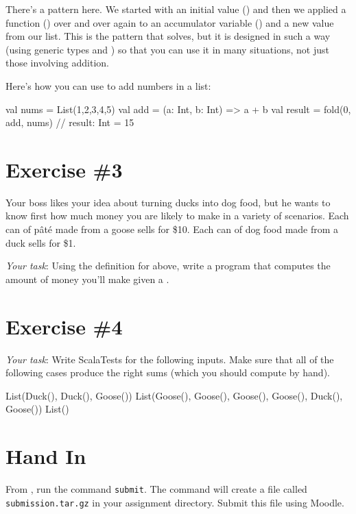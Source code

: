 \documentclass{book}
\begin{document}
There's a pattern here.  We started with an initial value () and then we applied a function (\scalainline{+}) over and over again to an accumulator variable () and a new value from our list.  This is the pattern that  solves, but it is designed in such a way (using generic types  and ) so that you can use it in many situations, not just those involving addition.

Here's how you can use  to add numbers in a list:

\begin{scalacode}
val nums = List(1,2,3,4,5)
val add = (a: Int, b: Int) => a + b
val result = fold(0, add, nums)
// result: Int = 15
\end{scalacode}

\section{Exercise \#3}

Your boss likes your idea about turning ducks into dog food, but he wants to know first how much money you are likely to make in a variety of scenarios.  Each can of p\^at\'e made from a goose sells for \$10.  Each can of dog food made from a duck sells for \$1.

\emph{Your task}: Using the definition for  above, write a program that computes the amount of money you'll make given a .

\section{Exercise \#4}

\emph{Your task}: Write ScalaTests for the following inputs.  Make sure that all of the following cases produce the right sums (which you should compute by hand).

\begin{scalacode}
List(Duck(), Duck(), Goose())
List(Goose(), Goose(), Goose(), Goose(), Duck(), Goose())
List()
\end{scalacode}

\section{Hand In}

From \sbt{}, run the command \verb|submit|. The command will create
a file called \verb|submission.tar.gz| in your assignment directory.
Submit this file using Moodle.
\end{document}
